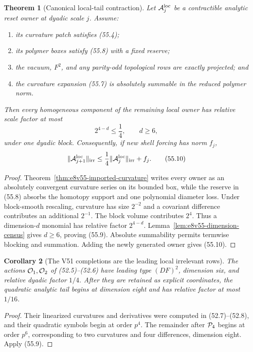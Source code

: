 \documentclass[11pt,oneside]{book}
\newtheorem{theorem}{Theorem}[chapter]
\newtheorem{corollary}[theorem]{Corollary}
\theoremstyle{definition}
\theoremstyle{remark}
\begin{document}
\begin{theorem}[Canonical local-tail contraction]
\label{thm:e8v55-local-tail-contraction}
Let \({\cal A}_j^{\rm loc}\) be a contractible analytic reset owner
at dyadic scale \(j\).  Assume:
\begin{enumerate}
\item its curvature patch satisfies (55.4);
\item its polymer boxes satisfy (55.8) with a fixed reserve;
\item the vacuum, \(F^2\), and any parity-odd topological rows are
      exactly projected; and
\item the curvature expansion (55.7) is absolutely summable in the
      reduced polymer norm.
\end{enumerate}
Then every homogeneous component of the remaining local owner has
relative scale factor at most
\[
 2^{4-d}\le\frac14,\qquad d\ge6,                              \tag{55.9}
\]
under one dyadic block.  Consequently, if new shell forcing has
norm \(f_j\),
\[
 \|{\cal A}_{j+1}^{\rm loc}\|_{\rm irr}
 \le\frac14\|{\cal A}_j^{\rm loc}\|_{\rm irr}+f_j.             \tag{55.10}
\]
\end{theorem}

\begin{proof}
Theorem~\ref{thm:e8v55-imported-curvature} writes every owner as an
absolutely convergent curvature series on its bounded box, while
the reserve in (55.8) absorbs the homotopy support and one
polynomial diameter loss.  Under block-smooth rescaling, curvature
has size \(2^{-2}\) and a covariant difference contributes an
additional \(2^{-1}\).  The block volume contributes \(2^4\).
Thus a dimension-\(d\) monomial has relative factor \(2^{4-d}\).
Lemma~\ref{lem:e8v55-dimension-census} gives \(d\ge6\), proving
(55.9).  Absolute summability permits termwise blocking and
summation.  Adding the newly generated owner gives (55.10).
\end{proof}

\begin{corollary}[The V51 completions are the leading local
irrelevant rows]
\label{cor:e8v55-leading-rows}
The actions \({\cal O}_1,{\cal O}_2\) of (52.5)--(52.6) have
leading type \((D F)^2\), dimension six, and relative dyadic factor
\(1/4\).  After they are retained as explicit coordinates, the
quadratic analytic tail begins at dimension eight and has relative
factor at most \(1/16\).
\end{corollary}

\begin{proof}
Their linearized curvatures and derivatives were computed in
(52.7)--(52.8), and their quadratic symbols begin at order
\(p^4\).  The remainder after \({\cal P}_4\) begins at order
\(p^6\), corresponding to two curvatures and four differences,
dimension eight.  Apply (55.9).
\end{proof}
\end{document}
